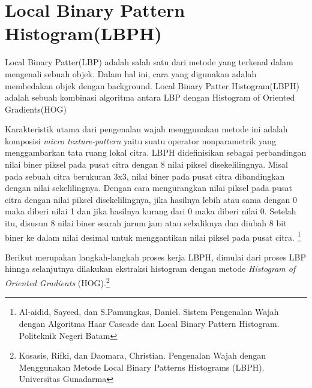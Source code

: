 \section{Local Binary Pattern Histogram(LBPH)}
Local Binary Patter(LBP) adalah salah satu dari metode yang  terkenal dalam mengenali sebuah objek. Dalam hal ini, cara yang digunakan adalah membedakan objek dengan background. 
Local Binary Patter Histogram(LBPH) adalah sebuah kombinasi algoritma antara LBP dengan Histogram of Oriented Gradients(HOG)

Karakteristik utama dari pengenalan wajah menggunakan metode ini adalah komposisi \emph{micro texture-pattern} yaitu suatu operator nonparametrik yang menggambarkan tata ruang lokal citra. 
LBPH didefinisikan sebagai perbandingan nilai biner piksel pada pusat citra dengan 8 nilai piksel disekelilingnya. Misal pada sebuah citra berukuran 3x3, nilai biner pada pusat citra dibandingkan dengan nilai sekelilingnya. 
Dengan cara mengurangkan nilai piksel pada pusat citra dengan nilai piksel disekelilingnya, jika hasilnya lebih atau sama dengan 0 maka diberi nilai 1 dan jika hasilnya kurang dari 0 maka diberi nilai 0. 
Setelah itu, disusun 8 nilai biner searah jarum jam atau sebaliknya dan diubah 8 bit biner ke dalam nilai desimal untuk menggantikan nilai piksel pada pusat citra.
\footnote{Al-aidid, Sayeed, dan S.Pamungkas, Daniel. Sistem Pengenalan Wajah dengan Algoritma Haar 
Cascade dan Local Binary Pattern Histogram. Politeknik Negeri Batam}

Berikut merupakan langkah-langkah proses kerja LBPH, dimulai dari proses LBP hinnga selanjutnya dilakukan ekstraksi histogram dengan metode \emph{Histogram of Oriented Gradients} (HOG).\footnote{Kosasis, Rifki, dan Daomara, Christian. Pengenalan Wajah dengan Menggunakan Metode Local Binary 
Patterns Histograms (LBPH). Universitas Gunadarma}

